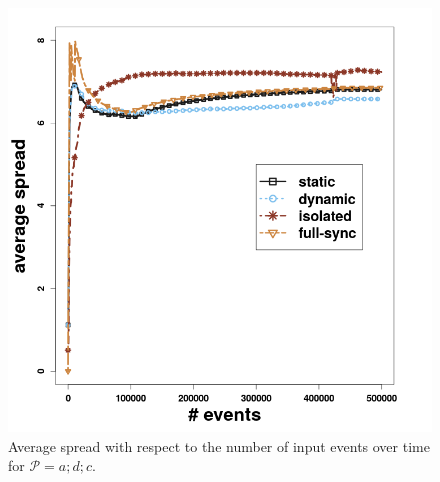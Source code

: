 \begin{figure}[H]
	\centering
	\includegraphics[width=\textwidth]{chapters/figures/synthetic/spread_synthetic_15_0001.png}
	
	\caption{Average spread  with respect to the number of input events over time for $\mathcal{P}=a;d;c$.}
	\label{fig:spread_synthetic}
\end{figure}

